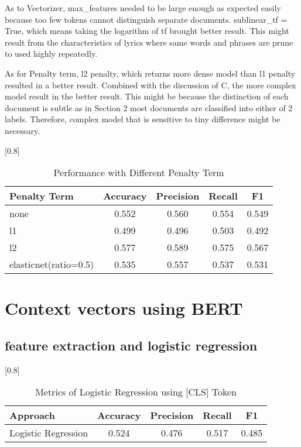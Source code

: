 \documentclass[a4paper,11pt]{article}
\begin{document}
As to Vectorizer, max\_features needed to be large enough as expected easily because too few tokens cannot distinguish separate documents.
sublinear\_tf = True, which means taking the logarithm of tf brought better result.
This might result from the characteristics of lyrics where same words and phrases are prune to used highly repeatedly.

As for Penalty term, l2 penalty, which returns more dense model than l1 penalty resulted in a better result.
Combined with the discussion of C, the more complex model result in the better result.
This might be because the distinction of each document is subtle as in Section 2 most documents are classified into either of 2 labels.
Therefore, complex model that is sensitive to tiny difference might be necessary.




\begin{table}[htbp]
    \centering
    \caption{Performance with Different Penalty Term}
    \small
    \scalebox{0.8}[0.8]{
    \begin{tabular}{l|cccc}
        Penalty Term & Accuracy & Precision & Recall & F1 \\ \hline 
        none & 0.552 & 0.560 & 0.554 & 0.549 \\ 
        l1 & 0.499 & 0.496 & 0.503 & 0.492 \\
        \rowcolor[rgb]{0.9,0.9,0}l2 & 0.577 & 0.589 & 0.575 & 0.567 \\
        elasticnet(ratio=0.5) & 0.535 & 0.557 & 0.537 & 0.531 \\



    \end{tabular}

    }
\end{table}

\section{Context vectors using BERT}

\subsection{feature extraction and logistic regression}

\begin{table}[htbp]
    \centering
    \caption{Metrics of Logistic Regression using [CLS] Token}
    \small
    \scalebox{0.8}[0.8]{
    \begin{tabular}{l|cccc}
         Approach & Accuracy & Precision & Recall & F1 \\ \hline 
         Logistic Regression & 0.524 & 0.476 & 0.517 & 0.485 \\ 

    \end{tabular}

    }
\end{table}
\end{document}
